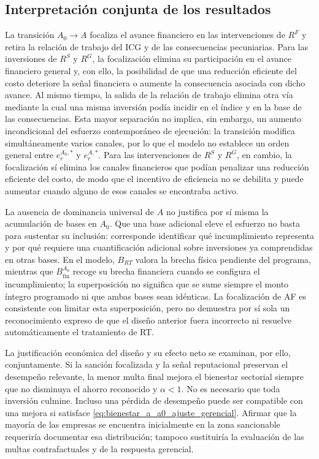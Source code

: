 \subsection{Interpretación conjunta de los resultados}
\label{subsec:discusion_resultados}

La transición \(A_{0}\rightarrow A\) focaliza el avance financiero en las intervenciones de \(R^{F}\) y retira la relación de trabajo del ICG y de las consecuencias pecuniarias. Para las inversiones de \(R^{S}\) y \(R^{G}\), la focalización elimina su participación en el avance financiero general y, con ello, la posibilidad de que una reducción eficiente del costo deteriore la señal financiera o aumente la consecuencia asociada con dicho avance. Al mismo tiempo, la salida de la relación de trabajo elimina otra vía mediante la cual una misma inversión podía incidir en el índice y en la base de las consecuencias. Esta mayor separación no implica, sin embargo, un aumento incondicional del esfuerzo contemporáneo de ejecución: la transición modifica simultáneamente varios canales, por lo que el modelo no establece un orden general entre \(e_r^{A_0,*}\) y \(e_r^{A,*}\). Para las intervenciones de \(R^{S}\) y \(R^{G}\), en cambio, la focalización sí elimina los canales financieros que podían penalizar una reducción eficiente del costo, de modo que el incentivo de eficiencia no se debilita y puede aumentar cuando alguno de esos canales se encontraba activo.

La ausencia de dominancia universal de \(A\) no justifica por sí misma la acumulación de bases en \(A_0\). Que una base adicional eleve el esfuerzo no basta para sustentar su inclusión: corresponde identificar qué incumplimiento representa y por qué requiere una cuantificación adicional sobre inversiones ya comprendidas en otras bases. En el modelo, \(B_{RT}\) valora la brecha física pendiente del programa, mientras que \(B_{\mathrm{fin}}^{A_0}\) recoge su brecha financiera cuando se configura el incumplimiento; la superposición no significa que se sume siempre el monto íntegro programado ni que ambas bases sean idénticas. La focalización de AF es consistente con limitar esta superposición, pero no demuestra por sí sola un reconocimiento expreso de que el diseño anterior fuera incorrecto ni resuelve automáticamente el tratamiento de RT.

La justificación económica del diseño y su efecto neto se examinan, por ello, conjuntamente. Si la sanción focalizada y la señal reputacional preservan el desempeño relevante, la menor multa final mejora el bienestar sectorial siempre que no disminuya el ahorro reconocido y \(\alpha<1\). No es necesario que toda inversión culmine. Incluso una pérdida de desempeño puede ser compatible con una mejora si satisface \eqref{eq:bienestar_a_a0_ajuste_gerencial}. Afirmar que la mayoría de las empresas se encuentra inicialmente en la zona sancionable requeriría documentar esa distribución; tampoco sustituiría la evaluación de las multas contrafactuales y de la respuesta gerencial.

